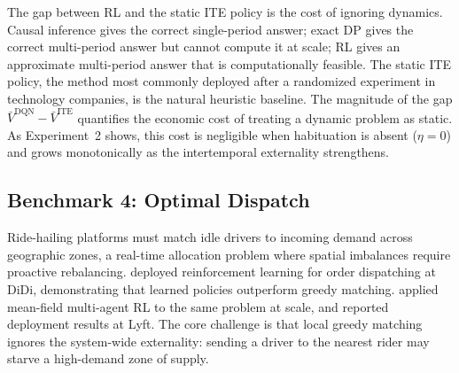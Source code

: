 

The gap between RL and the static ITE policy is the cost of ignoring dynamics. Causal inference gives the correct single-period answer; exact DP gives the correct multi-period answer but cannot compute it at scale; RL gives an approximate multi-period answer that is computationally feasible. The static ITE policy, the method most commonly deployed after a randomized experiment in technology companies, is the natural heuristic baseline. The magnitude of the gap $\bar{V}^{\mathrm{DQN}} - \bar{V}^{\mathrm{ITE}}$ quantifies the economic cost of treating a dynamic problem as static. As Experiment~2 shows, this cost is negligible when habituation is absent ($\eta = 0$) and grows monotonically as the intertemporal externality strengthens.


\subsection{Benchmark 4: Optimal Dispatch}
\label{sec:benchmark_dispatch}

Ride-hailing platforms must match idle drivers to incoming demand across geographic zones, a real-time allocation problem where spatial imbalances require proactive rebalancing. \citet{Qin2021dispatch} deployed reinforcement learning for order dispatching at DiDi, demonstrating that learned policies outperform greedy matching. \citet{Li2019ridesharing} applied mean-field multi-agent RL to the same problem at scale, and \citet{Han2022lyft} reported deployment results at Lyft. The core challenge is that local greedy matching ignores the system-wide externality: sending a driver to the nearest rider may starve a high-demand zone of supply.

